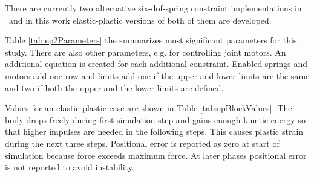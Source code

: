 There are currently two alternative six-dof-spring constraint implementations in \cbullet\ and 
in this work elastic-plastic versions of both of them are developed. 

Table  \ref{tab:ep2Parameters} the summarizes most significant parameters for this study.
There are also other parameters, e.g. for controlling joint motors.
An additional equation is created for each additional constraint. 
Enabled springs and motors add one row and
limits add one if the upper and lower limits are the same and two if both the 
upper and the lower limits are defined.

\begin{table}
\label{tab:ep2Parameters} 
\end {table}


Values for an elastic-plastic case are shown in Table \ref{tab:epBlockValues}.
The body drops freely during first simulation step and 
gains enough kinetic energy so that higher impulses are needed in the following steps.
This causes plastic strain during the next three steps. 
Positional error is reported as zero at start of simulation because force exceeds
maximum force.  At later phases positional error is not reported to avoid instability.

